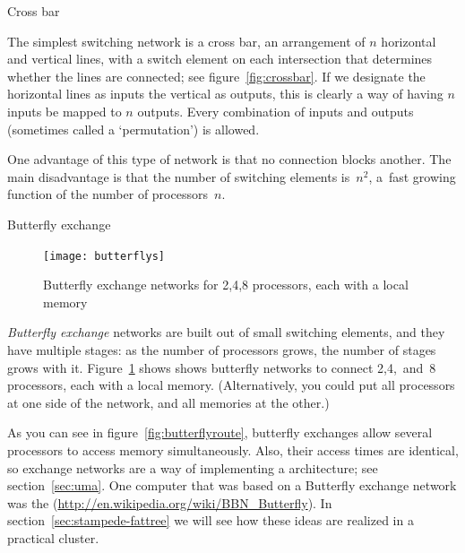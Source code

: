  {Cross bar}

\begin{notlulu}
  \crossbarfig
\end{notlulu}
%
\begin{lulu}
  \crossbarfig
\end{lulu}
%
The simplest switching network is a cross bar, an arrangement of $n$
horizontal and vertical lines, with a switch element on each
intersection that determines whether the lines are connected; see
figure~\ref{fig:crossbar}. If we designate the horizontal lines as
inputs the vertical as outputs, this is clearly a way of having $n$
inputs be mapped to $n$ outputs. Every combination of inputs and
outputs (sometimes called a `permutation') is allowed.

One advantage of this type of network is that no connection 
blocks another.
The main disadvantage  is that the number of 
switching elements is~$n^2$, a~fast growing function of the
number of processors~$n$.

 {Butterfly exchange}

\begin{figure}[ht]
  \texttt{[image: butterflys]}
  \caption{Butterfly exchange networks for 2,4,8 processors, each with
    a local memory}
  \label{fig:butterfly}
\end{figure}

\emph{Butterfly exchange} networks are built out of small switching
elements, and they have multiple stages: as the number of processors
grows, the number of stages grows with it. Figure~\ref{fig:butterfly}
shows shows butterfly networks to connect 2,4,~and~8 processors, each
with a local memory. (Alternatively, you could put all processors at
one side of the network, and all memories at the other.)

As you can see in figure~\ref{fig:butterflyroute}, butterfly exchanges
allow several processors to access memory simultaneously. Also, their
access times are identical, so exchange networks are a way of
implementing a  architecture; see
section~\ref{sec:uma}. One computer that was based on a Butterfly
exchange network was the 
(\url{http://en.wikipedia.org/wiki/BBN_Butterfly}).  In
section~\ref{sec:stampede-fattree} we will see how these ideas are
realized in a practical cluster.

